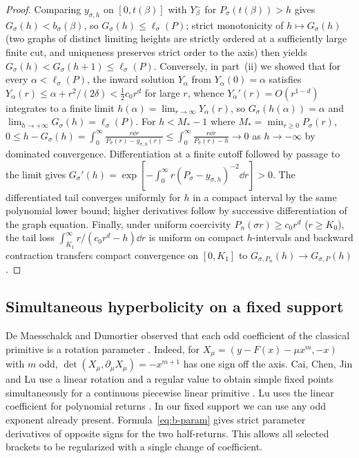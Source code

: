 \begin{proof}
Comparing $y_{\sigma,h}$ on $[0,t(\beta)]$ with $Y_\beta^-$ for $P_\sigma(t(\beta))>h$ gives
$G_\sigma(h)<b_\sigma(\beta)$, so $G_\sigma(h)\le \ell_\sigma(P)$; strict monotonicity of $h\mapsto
G_\sigma(h)$ (two graphs of distinct limiting heights are strictly ordered at a sufficiently large
finite cut, and uniqueness preserves strict order to the axis) then yields
$G_\sigma(h)<G_\sigma(h+1)\le \ell_\sigma(P)$. Conversely, in part~(ii) we showed that for every
$\alpha<\ell_\sigma(P)$, the inward solution $Y_\alpha$ from $Y_\alpha(0)=\alpha$ satisfies
$Y_\alpha(r)\le\alpha+r^2/(2\delta)<\frac{1}{2}c_0 r^d$ for large $r$, whence
$Y_\alpha'(r)=O(r^{1-d})$ integrates to a finite limit $h(\alpha)=\lim_{r\to\infty}Y_\alpha(r)$, so
$G_\sigma(h(\alpha))=\alpha$ and $\lim_{h\to+\infty}G_\sigma(h)=\ell_\sigma(P)$. For $h<M_*-1$ where
$M_*=\min_{r\ge 0}P_\sigma(r)$, $0\le h-G_\sigma(h)=\int_0^\infty\frac{r\dd
r}{P_\sigma(r)-y_{\sigma,h}(r)}\le \int_0^\infty\frac{r\dd r}{P_\sigma(r)-h}\to 0$ as $h\to-\infty$ by
dominated convergence. Differentiation at a finite cutoff followed by passage to the limit gives
$G_\sigma'(h)=\exp[-\int_0^\infty r(P_\sigma-y_{\sigma,h})^{-2}\dd r]>0$.
The differentiated tail converges uniformly for $h$ in a compact interval
by the same polynomial lower bound; higher derivatives follow by successive
differentiation of the graph equation. Finally, under uniform coercivity $P_n(\sigma r)\ge c_0 r^d$
($r\ge K_0$), the tail loss $\int_{K_1}^\infty r/(c_0 r^d-h)\dd r$ is uniform on compact $h$-intervals
and backward contraction transfers compact convergence on $[0,K_1]$ to $G_{\sigma,P_n}(h)\to
G_{\sigma,P}(h)$.
\end{proof}


\subsection{Simultaneous hyperbolicity on a fixed support}\label{subsec:hyperbolicity}

De Maesschalck and Dumortier observed that each odd coefficient of
the classical primitive is a rotation parameter \cite[pp.~2163--2164]{DMD}.
Indeed, for $X_\mu=(y-F(x)-\mu x^m,-x)$ with $m$ odd,
$\det(X_\mu,\partial_\mu X_\mu)=-x^{m+1}$ has one sign off the axis.
Cai, Chen, Jin and Lu use a linear rotation and a regular value to
obtain simple fixed points simultaneously for a continuous piecewise
linear primitive \cite[proof of Theorem~1.1 in \S2]{CCJL}. Lu uses
the linear coefficient for polynomial returns
\cite[Proposition~2.4(i)]{LuDegree}. In our fixed support we can use
any odd exponent already present. Formula~\eqref{eq:b-param} gives
strict parameter derivatives of opposite signs for the two half-returns.
This allows all selected brackets to be regularized with a single change
of coefficient.

